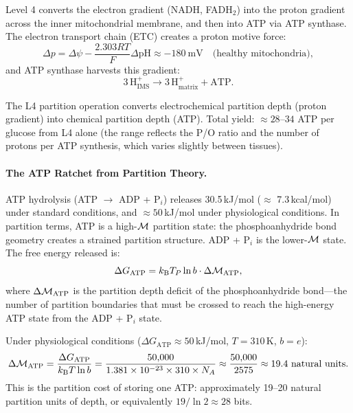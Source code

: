 Level 4 converts the electron gradient (NADH, FADH$_2$) into the proton
gradient across the inner mitochondrial membrane, and then into ATP via
ATP synthase. The electron transport chain (ETC) creates a proton motive
force:
\begin{equation}
  \Delta p = \Delta\psi - \frac{2.303 RT}{F} \Delta \mathrm{pH}
           \approx -180\ \mathrm{mV} \quad \text{(healthy mitochondria)},
  \label{eq:pmf}
\end{equation}
and ATP synthase harvests this gradient:
\begin{equation}
  3\,\mathrm{H}^+_{\mathrm{IMS}} \to 3\,\mathrm{H}^+_{\mathrm{matrix}}
    + \mathrm{ATP}.
  \label{eq:atp_synthase}
\end{equation}

The L4 partition operation converts electrochemical partition depth
(proton gradient) into chemical partition depth (ATP). Total yield:
$\approx 28$--$34$ ATP per glucose from L4 alone (the range reflects
the P/O ratio and the number of protons per ATP synthesis, which varies
slightly between tissues).

\paragraph{The ATP Ratchet from Partition Theory.}
ATP hydrolysis (ATP $\to$ ADP + P$_i$) releases 30.5\,kJ/mol ($\approx$ 7.3\,kcal/mol)
under standard conditions, and $\approx 50$\,kJ/mol under physiological conditions.
In partition terms, ATP is a high-$\mathcal{M}$ partition state: the phosphoanhydride
bond geometry creates a strained partition structure. ADP + P$_i$ is the lower-$\mathcal{M}$
state. The free energy released is:
\begin{equation}
  \Delta G_{\mathrm{ATP}} = k_{\mathrm{B}} T_P \ln b \cdot \Delta\mathcal{M}_{\mathrm{ATP}},
  \label{eq:atp_partition_energy}
\end{equation}
where $\Delta\mathcal{M}_{\mathrm{ATP}}$ is the partition depth deficit of the
phosphoanhydride bond---the number of partition boundaries that must be
crossed to reach the high-energy ATP state from the ADP + P$_i$ state.

Under physiological conditions ($\Delta G_{\mathrm{ATP}} \approx 50$\,kJ/mol,
$T = 310$\,K, $b = e$):
\begin{equation}
  \Delta\mathcal{M}_{\mathrm{ATP}} = \frac{\Delta G_{\mathrm{ATP}}}{k_{\mathrm{B}} T \ln b}
    = \frac{50{,}000}{1.381 \times 10^{-23} \times 310 \times N_A}
    \approx \frac{50{,}000}{2575} \approx 19.4\ \text{natural units}.
\end{equation}
This is the partition cost of storing one ATP: approximately 19--20 natural
partition units of depth, or equivalently $19 / \ln 2 \approx 28$ bits.

